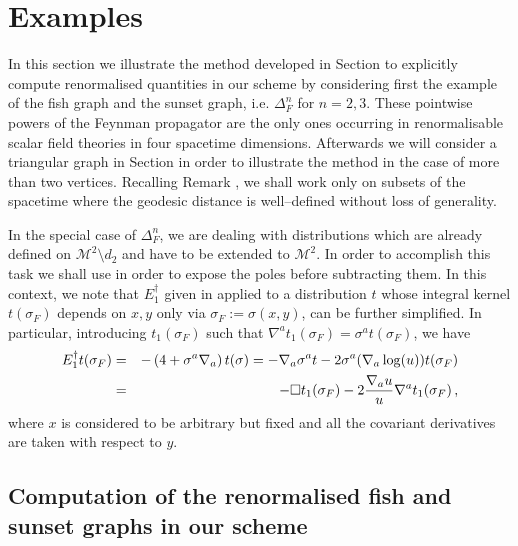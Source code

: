 \documentclass[10pt]{book}
\newcommand{\Mcal}{\mathcal{M}}
\theoremstyle{break}
\begin{document}
\section{Examples}


In this section we illustrate the method developed in Section %
to explicitly compute renormalised quantities in our scheme by considering first the example of the fish graph and the sunset graph, i.e. $\Delta^n_F$ for $n=2,3$. These pointwise powers of the Feynman propagator are the only ones occurring in renormalisable scalar field theories in four spacetime dimensions. Afterwards we will consider a triangular graph in Section %
in order to illustrate the method in the case of more than two vertices. Recalling Remark %
, we shall work only on subsets of the spacetime where the geodesic distance is well--defined without loss of generality.

In the special case of $\Delta^n_F$, we are dealing with distributions which are already defined on $\Mcal^2\setminus d_2$ and have to be extended to $\Mcal^2$. In order to accomplish this task we shall use %
in order to expose the poles before subtracting them. In this context, we note that  $E^\dagger_1$ given in %
applied to a distribution $t$ whose integral kernel $t(\sigma_F)$ depends on $x,y$  only via $\sigma_F:=\sigma(x,y)$, can be further simplified. 
In particular, introducing $t_1(\sigma_F)$ such that $\nabla^a t_1(\sigma_F) = \sigma^a t(\sigma_F)$, we have 
\begin{eqnarray}
E^\dagger_1 t(\sigma_F)&=& -\left( 4 +  \sigma^a\nabla_a   \right)t(\sigma)  = 
- \nabla_a \sigma^a  t - 2 \sigma^a (\nabla_a \log (u))   t(\sigma_F)  \\ &=&
- \Box t_1(\sigma_F)  - 2  \frac{\nabla_a u}{u}   \nabla^a t_1(\sigma_F)\,,\notag  
\end{eqnarray}
where $x$ is considered to be arbitrary but fixed and all the covariant derivatives are taken with respect to $y$.


\subsection{Computation of the renormalised fish and sunset graphs in our scheme}
\end{document}
